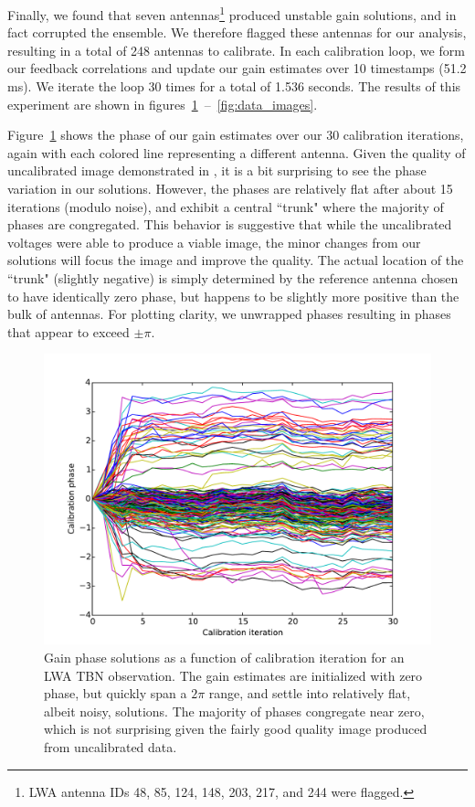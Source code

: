 \documentclass[a4paper,fleqn,usenatbib]{../mnras}
\begin{document}
Finally, we found that seven antennas\footnote{LWA antenna IDs 48, 85, 124, 148, 203, 217, and 244 were flagged.} produced unstable gain solutions, and in fact corrupted the ensemble. We therefore flagged these antennas for our analysis, resulting in a total of 248 antennas to calibrate. In each calibration loop, we form our feedback correlations and update our gain estimates over 10 timestamps (51.2 ms). We iterate the loop 30 times for a total of 1.536 seconds. The results of this experiment are shown in figures~\ref{fig:data_phase}~--~\ref{fig:data_images}.

Figure~\ref{fig:data_phase} shows the phase of our gain estimates over our 30 calibration iterations, again with each colored line representing a different antenna. Given the quality of uncalibrated image demonstrated in \cite{thy15c}, it is a bit surprising to see the phase variation in our solutions. However, the phases are relatively flat after about 15 iterations (modulo noise), and exhibit a central ``trunk" where the majority of phases are congregated. This behavior is suggestive that while the uncalibrated voltages were able to produce a viable image, the minor changes from our solutions will focus the image and improve the quality. The actual location of the ``trunk" (slightly negative) is simply determined by the reference antenna chosen to have identically zero phase, but happens to be slightly more positive than the bulk of antennas. For plotting clarity, we unwrapped phases resulting in phases that appear to exceed $\pm \pi$.

\begin{figure}
\begin{center}
\includegraphics[width=\columnwidth]{figures/cal_paper_data_phases.pdf}
\caption{Gain phase solutions as a function of calibration iteration for an LWA TBN observation. The gain estimates are initialized with zero phase, but quickly span a $2\pi$ range, and settle into relatively flat, albeit noisy, solutions. The majority of phases congregate near zero, which is not surprising given the fairly good quality image produced from uncalibrated data.
}
\label{fig:data_phase}
\end{center}
\end{figure}
\end{document}
